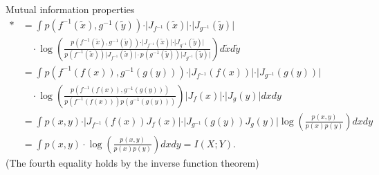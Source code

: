 \documentclass[11pt,compress,t,notes=noshow, xcolor=table]{beamer}
\begin{document}
\begin{vbframe}{Mutual information properties}
\begin{align*}
* & = \int p(f^{-1}(\tilde{x}), g^{-1}(\tilde{y}))\cdot\vert J_{f^{-1}}(\tilde{x})\vert\cdot\vert J_{g^{-1}}(\tilde{y})\vert \\ &\quad\cdot \log\left(\frac{ p(f^{-1}(\tilde{x}), g^{-1}(\tilde{y}))\cdot\vert J_{f^{-1}}(\tilde{x})\vert\cdot\vert J_{g^{-1}}(\tilde{y})\vert }{p(f^{-1}(\tilde{x}))\vert J_{f^{-1}}(\tilde{x})\vert \cdot p(g^{-1}(\tilde{y}))\vert J_{g^{-1}}(\tilde{y})\vert}\right)d\tilde{x}d\tilde{y}
\\&= \int p(f^{-1}(f(x)), g^{-1}(g(y)))\cdot\vert J_{f^{-1}}(f(x))\vert\cdot\vert J_{g^{-1}}(g(y))\vert \\ &\quad\cdot \log\left(\frac{p(f^{-1}(f(x)), g^{-1}(g(y)))}{p(f^{-1}(f(x)))p(g^{-1}(g(y)))}\right)\vert J_f(x)\vert\cdot\vert J_g(y)\vert dxdy \\
    &=   \int p(x, y)\cdot\vert J_{f^{-1}}(f(x))J_f(x)\vert\cdot\vert J_{g^{-1}}(g(y))J_g(y)\vert  \log\left(\frac{p(x, y)}{p(x)p(y)}\right)dxdy \\
        &=   \int p(x, y)\cdot \log\left(\frac{p(x, y)}{p(x)p(y)}\right)dxdy = I(X; Y).
\end{align*}
(The fourth equality holds by the inverse function theorem)
\end{vbframe}


\endlecture
\end{document}
